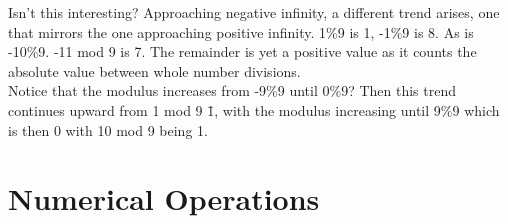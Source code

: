 \documentclass[oneside,12pt]{memoir} %
\begin{document}
Isn't this interesting? Approaching negative infinity, a different trend arises, one that mirrors the one approaching positive infinity. 1\%9 is 1, -1\%9 is 8. As is -10\%9. -11 mod 9 is 7. The remainder is yet a positive value as it counts the absolute value between whole number divisions.\\

Notice that the modulus increases from -9\%9 until 0\%9? Then this trend continues upward from 1 mod 9 \= 1, with the modulus increasing until 9\%9 which is then 0 with 10 mod 9 being 1.

\section{Numerical Operations}
\label{numerical_operations}


\end{document}
